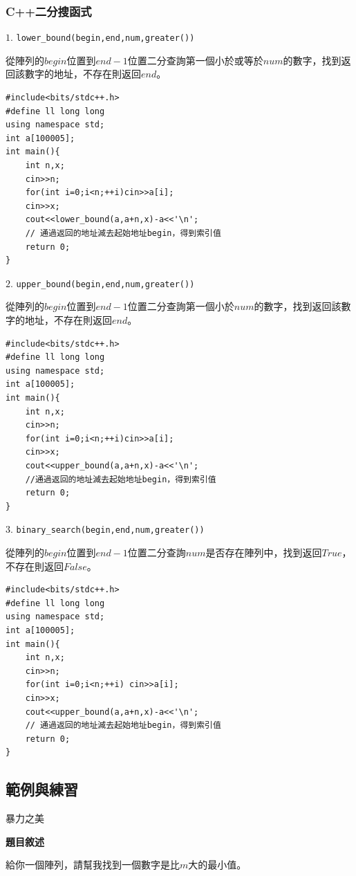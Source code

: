     \subsubsection{C++二分搜函式}
    
    $1.$ \verb|lower_bound(begin,end,num,greater())|
    
    從陣列的$begin$位置到$end-1$位置二分查詢第一個小於或等於$num$的數字，找到返回該數字的地址，不存在則返回$end$。 

    \begin{lstlisting}
#include<bits/stdc++.h>
#define ll long long
using namespace std;
int a[100005];
int main(){
    int n,x;
    cin>>n;
    for(int i=0;i<n;++i)cin>>a[i];
    cin>>x;
    cout<<lower_bound(a,a+n,x)-a<<'\n';
    // 通過返回的地址減去起始地址begin，得到索引值
    return 0;
} \end{lstlisting}

    $2.$ \verb|upper_bound(begin,end,num,greater())|
    
    從陣列的$begin$位置到$end-1$位置二分查詢第一個小於$num$的數字，找到返回該數字的地址，不存在則返回$end$。

    \begin{lstlisting}
#include<bits/stdc++.h>
#define ll long long
using namespace std;
int a[100005];
int main(){
    int n,x;
    cin>>n;
    for(int i=0;i<n;++i)cin>>a[i];
    cin>>x;
    cout<<upper_bound(a,a+n,x)-a<<'\n';
    //通過返回的地址減去起始地址begin，得到索引值
    return 0;
} \end{lstlisting}

    $3.$ \verb|binary_search(begin,end,num,greater())|
    
    從陣列的$begin$位置到$end-1$位置二分查詢$num$是否存在陣列中，找到返回$True$，不存在則返回$False$。

    \begin{lstlisting}
#include<bits/stdc++.h>
#define ll long long
using namespace std;
int a[100005];
int main(){
    int n,x;
    cin>>n;
    for(int i=0;i<n;++i) cin>>a[i];
    cin>>x;
    cout<<upper_bound(a,a+n,x)-a<<'\n';
    // 通過返回的地址減去起始地址begin，得到索引值
    return 0;
} \end{lstlisting}

    \subsection{範例與練習}
    \problem 暴力之美

    \textbf{題目敘述}

    給你一個陣列，請幫我找到一個數字是比$m$大的最小值。

